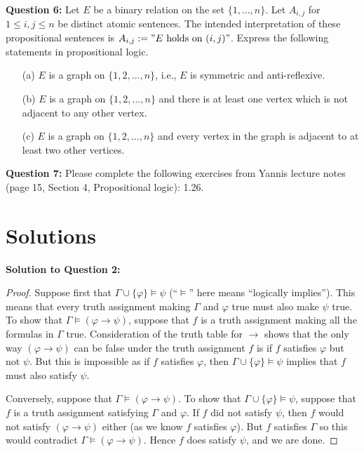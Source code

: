 \documentclass{article}
\begin{document}
\textbf{Question 6:} Let \(E\) be a binary relation on the set \(\{1, ..., n\}\). Let \(A_{i,j}\) for \(1 \leq i, j \leq n\) be distinct atomic sentences. The intended interpretation of these propositional sentences is \(A_{i,j} := "E \text{ holds on } (i, j)"\). Express the following statements in propositional logic.
\begin{itemize}
    \item[(a)] \(E\) is a graph on \(\{1, 2, ..., n\}\), i.e., \(E\) is symmetric and anti-reflexive.
    \item[(b)] \(E\) is a graph on \(\{1, 2, ..., n\}\) and there is at least one vertex which is not adjacent to any other vertex.
    \item[(c)] \(E\) is a graph on \(\{1, 2, ..., n\}\) and every vertex in the graph is adjacent to at least two other vertices.
\end{itemize}

\textbf{Question 7:} Please complete the following exercises from Yannis lecture notes (page 15, Section 4, Propositional logic): 1.26.

\section*{Solutions}

\textbf{Solution to Question 2:}
\begin{proof}
Suppose first that \(\Gamma \cup \{\varphi\} \models \psi\) (“\(\models\)” here means “logically implies”). This means that every truth assignment making \(\Gamma\) and \(\varphi\) true must also make \(\psi\) true. To show that \(\Gamma \models (\varphi \to \psi)\), suppose that \(f\) is a truth assignment making all the formulas in \(\Gamma\) true. Consideration of the truth table for \(\to\) shows that the only way \((\varphi \to \psi)\) can be false under the truth assignment \(f\) is if \(f\) satisfies \(\varphi\) but not \(\psi\). But this is impossible as if \(f\) satisfies \(\varphi\), then \(\Gamma \cup \{\varphi\} \models \psi\) implies that \(f\) must also satisfy \(\psi\).

Conversely, suppose that \(\Gamma \models (\varphi \to \psi)\). To show that \(\Gamma \cup \{\varphi\} \models \psi\), suppose that \(f\) is a truth assignment satisfying \(\Gamma\) and \(\varphi\). If \(f\) did not satisfy \(\psi\), then \(f\) would not satisfy \((\varphi \to \psi)\) either (as we know \(f\) satisfies \(\varphi\)). But \(f\) satisfies \(\Gamma\) so this would contradict \(\Gamma \models (\varphi \to \psi)\). Hence \(f\) does satisfy \(\psi\), and we are done.
\end{proof}
\end{document}
